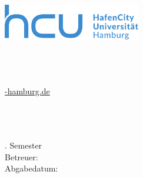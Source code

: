 \begin{titlepage}
	\thispagestyle{empty}
	
	\begin{minipage}[t]{0.4\textwidth}
		\vspace{0pt}
		\includegraphics[width=60mm]{Daten/hcu_logo.pdf}
	\end{minipage}
	\hfill
	\begin{minipage}[t]{0.5\textwidth}
		\vspace{0pt}
		\begin{flushright}
			\Verfasser\\
			\Matrikel\\
			\Modul\\
			\href{mailto:\Mail@hcu-hamburg.de}{\Mail@hcu-hamburg.de} \\
		\end{flushright}
	\end{minipage}
	
	\vfill
	
	\begin {center}
	\Large \Art
	\end {center}
	\begin {center}
	\huge \Titel
	\end {center}
	
	\vfill
	
	\begin{flushleft}
		\Veranstaltung\\
		\Semester \\
		\Studiengang\\
		\Fachsemester. Semester\\
		\vspace{10pt}
		Betreuer: \\ 
		\Betreuer
		\vspace{30pt}
		Abgabedatum: \Abgabe
	\end{flushleft}
	
\end{titlepage}